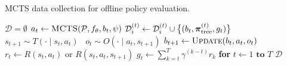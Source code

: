 \begin{algorithm}[H]
    \caption{MCTS data collection for offline policy evaluation.} 
    \label{alg:collect_data}
    \begin{algorithmic}[1]
        \State $\mathcal{D} = \emptyset$
          \label{line:parallel}
                \State $a_t \leftarrow \textproc{MCTS}(\mathcal{P}, f_\theta, b_t, \psi)$ 
                \State $\mathcal{D}_i^{(t)} \leftarrow \mathcal{D}_i^{(t)} \cup \big\{(b_t, \boldsymbol\pi_\text{tree}^{(t)}, g_t) \big\}$ 
                \State $s_{t+1} \sim T(\cdot \mid s_t, a_t)\phantom{\big\}}$
                \State $o_t \sim O(\cdot \mid a_t, s_{t+1})$
                \State $b_{t+1} \leftarrow \textproc{Update}(b_t, a_t, o_t)$
                \hspace*{3em}%
                \State $r_t \leftarrow R(s_t, a_t)$ or $R(s_t, a_t, s_{t+1})$
            \EndFor
            \State $g_t \leftarrow \sum_{k=t}^T \gamma^{(k-t)} r_k$ \textbf{ for } $t \leftarrow 1 \textbf{ to } T$ 
        \EndParallelFor
        \State \Return $\mathcal{D}$
    \EndFunction
    \end{algorithmic}
\end{algorithm}